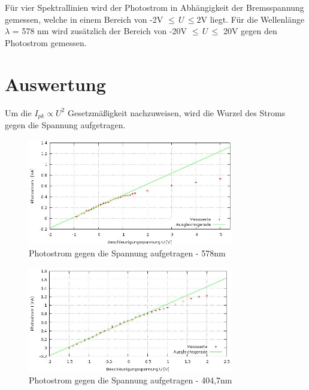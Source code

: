 Für vier Spektrallinien wird der Photostrom in Abhängigkeit der Bremsspannung gemessen, welche in einem Bereich von -2V $\leq \,U \, \leq 2$V
liegt. Für die Wellenlänge $\lambda$ = 578 nm wird zusätzlich der Bereich von -20V $\leq \,U \, \leq$ 20V gegen den Photostrom gemessen.


\section{Auswertung}
Um die $I_{pk} \propto U^2$
Gesetzmäßigkeit nachzuweisen, wird die Wurzel des Stroms gegen die Spannung aufgetragen.

\begin{figure}[H]
\includegraphics[width=0.8\textwidth]{pics/wurzel578.jpg}
\caption{Photostrom gegen die Spannung aufgetragen - 578nm}
\end{figure}

\begin{figure}[H]
\includegraphics[width=0.8\textwidth]{pics/wurzel404.jpg}
\caption{Photostrom gegen die Spannung aufgetragen - 404,7nm}
\end{figure}

